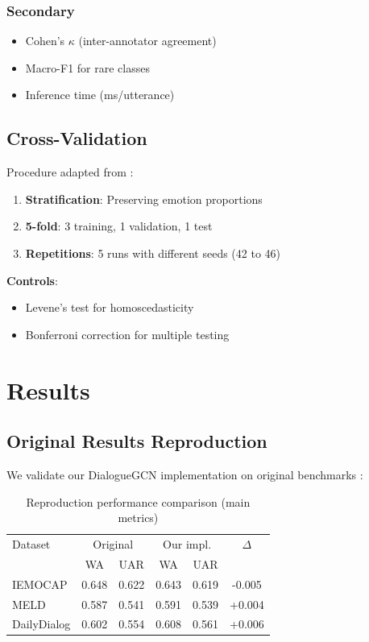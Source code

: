 \documentclass[a4paper,11pt]{article}
\begin{document}
\subsubsection{Secondary}
\begin{itemize}
    \item Cohen's $\kappa$ (inter-annotator agreement) \cite{artstein2008inter}
    \item Macro-F1 for rare classes \cite{opitz2019macro}
    \item Inference time (ms/utterance) \cite{wang2020efficiency}
\end{itemize}

\subsection{Cross-Validation}
Procedure adapted from \cite{rodriguez2010cross}:

\begin{enumerate}
    \item \textbf{Stratification}: Preserving emotion proportions
    \item \textbf{5-fold}: 3 training, 1 validation, 1 test
    \item \textbf{Repetitions}: 5 runs with different seeds (42 to 46)
\end{enumerate}

\textbf{Controls}:
\begin{itemize}
    \item Levene's test for homoscedasticity \cite{levene1960robust}
    \item Bonferroni correction for multiple testing \cite{abdi2007bonferroni}
\end{itemize}

\section{Results}
\subsection{Original Results Reproduction}
We validate our DialogueGCN implementation on original benchmarks \cite{ghosal2019dialoguegcn}:

\begin{table}[h]
\centering
\begin{tabular}{lccccc}
\toprule
Dataset & \multicolumn{2}{c}{Original} & \multicolumn{2}{c}{Our impl.} & $\Delta$ \\
 & WA & UAR & WA & UAR & \\
\midrule
IEMOCAP & 0.648 & 0.622 & 0.643 & 0.619 & -0.005 \\
MELD & 0.587 & 0.541 & 0.591 & 0.539 & +0.004 \\
DailyDialog & 0.602 & 0.554 & 0.608 & 0.561 & +0.006 \\
\bottomrule
\end{tabular}
\caption{Reproduction performance comparison (main metrics)}
\label{tab:repro}
\end{table}
\end{document}
